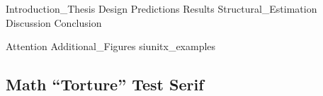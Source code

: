 \documentclass[12pt, a4paper, oneside, full]{article}
\begin{document}
\title{\termpapertitle}
\author{\studentfullname}
\date{\today}


{Introduction_Thesis}
{Design}
{Predictions}
{Results}
{Structural_Estimation}
{Discussion}
{Conclusion}

\clearpage

\begin{appendices}
	\label{sec:appendix}
	\FloatBarrier
	{Attention}
	\FloatBarrier
	\clearpage
	{Additional_Figures}
	\FloatBarrier
	{siunitx_examples}
	\clearpage
	
	\renewcommand{\showfamily}{{\color{magenta}%
		Serif%
	}}
	{\rmfamily\mdseries%
	 \subsection{Math ``Torture'' Test \showfamily}
	}
\end{appendices}

\clearpage %


\begin{refcontext}[sorting=nyt]  %
\sloppy
\printbibliography[heading=bibintoc]
\end{refcontext}
\end{document}
